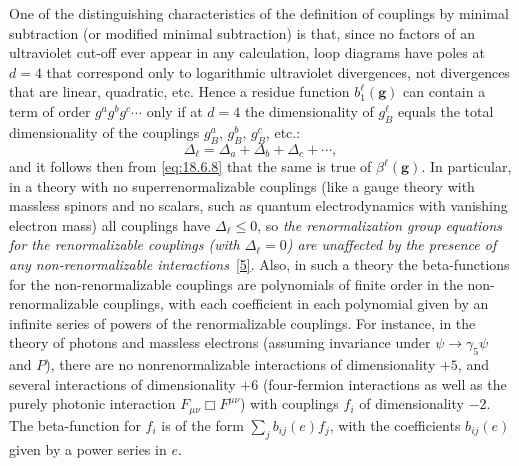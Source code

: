 One of the distinguishing characteristics of the definition of couplings by minimal subtraction (or modified minimal subtraction) is that, since no factors of an ultraviolet cut-off ever appear in any calculation, loop diagrams have poles at $d=4$ that correspond only to logarithmic ultraviolet divergences, not divergences that are linear, quadratic, etc. Hence a residue function $b_1^\ell(\mathbf{g})$ can contain a term of order $g^a g^b g^c\cdots$ only if at $d=4$ the dimensionality of $g_B^\ell$ equals the total dimensionality of the couplings $g_B^a$, $g_B^b$, $g_B^c$, etc.:
\begin{equation}
\Delta_\ell=\Delta_a+\Delta_b+\Delta_c+\cdots,
\tag{18.6.15}\label{eq:18.6.15}
\end{equation}
and it follows then from \eqref{eq:18.6.8} that the same is true of $\beta^\ell(\mathbf{g})$. In particular, in a theory with no superrenormalizable couplings (like a gauge theory with massless spinors and no scalars, such as quantum electrodynamics with vanishing electron mass) all couplings have $\Delta_\ell\leq0$, so \emph{the renormalization group equations for the renormalizable couplings (with $\Delta_\ell=0$) are unaffected by the presence of any non-renormalizable interactions}~\hyperref[ch18-ref-5]{[5]}. Also, in such a theory the beta-functions for the non-renormalizable couplings are polynomials of finite order in the non-renormalizable couplings, with each coefficient in each polynomial given by an infinite series of powers of the renormalizable couplings. For instance, in the theory of photons and massless electrons (assuming invariance under $\psi\to\gamma_5\psi$ and $P$), there are no nonrenormalizable interactions of dimensionality $+5$, and several interactions of dimensionality $+6$ (four-fermion interactions as well as the purely photonic interaction $F_{\mu\nu}\Box F^{\mu\nu}$) with couplings $f_i$ of dimensionality $-2$. The beta-function for $f_i$ is of the form $\sum_j b_{ij}(e)f_j$, with the coefficients $b_{ij}(e)$ given by a power series in $e$.
